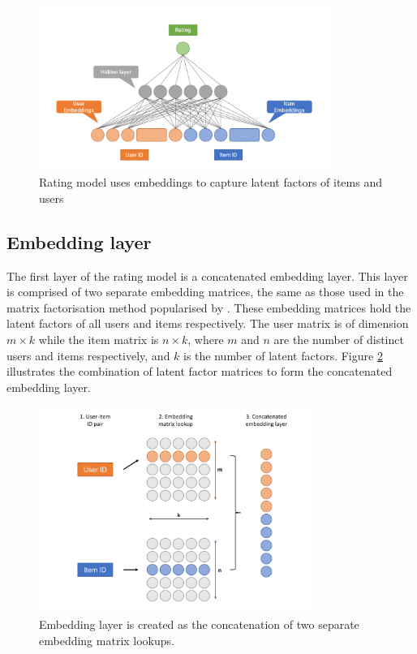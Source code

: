 \begin{figure}[H]
\centering
\includegraphics[width=0.85\textwidth]{Figures/4_rating-model.pdf}
\decoRule
\caption[Rating model]{Rating model uses embeddings to capture latent factors of items and users}
\label{fig:4_rating-prediction-architecture}
\end{figure}

\subsection{Embedding layer}
The first layer of the rating model is a concatenated embedding layer. This layer is comprised of two separate embedding matrices, the same as those used in the matrix factorisation method popularised by \citeauthor{koren2009matrix}. These embedding matrices hold the latent factors of all users and items respectively. The user matrix is of dimension $m\times k$ while the item matrix is $n\times k$, where $m$ and $n$ are the number of distinct users and items respectively, and $k$ is the number of latent factors. Figure \ref{fig:4_CGT-embedding-layer} illustrates the combination of latent factor matrices to form the concatenated embedding layer.

\begin{figure}[H]
\centering
\includegraphics[width=0.8\textwidth]{Figures/4_CGT-embedding-layer.pdf}
\decoRule
\caption[Embedding layer]{Embedding layer is created as the concatenation of two separate embedding matrix lookups.}
\label{fig:4_CGT-embedding-layer}
\end{figure}

